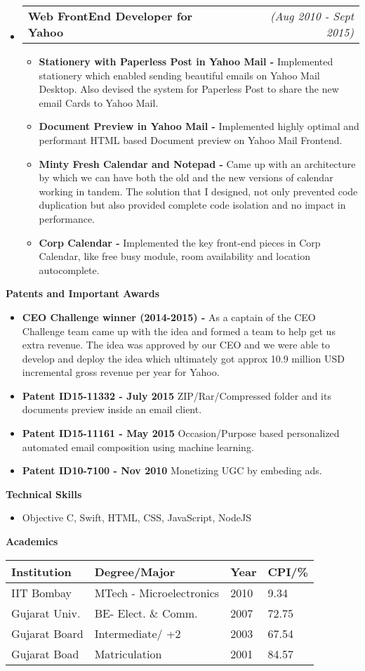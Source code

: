 \documentclass[a4paper,11pt,times]{res}
\makeatletter
\newcommand{\smalitem}[1]{\item #1 \vspace{-4pt}}
\newcommand{\resheading}[1]{{\large \colorbox{mygrey}{\begin{minipage}{\textwidth}{\textbf{#1 \vphantom{p\^{E}}}}\end{minipage}}\vspace{4pt}}}
\newcommand{\mysubheading}[2]{
\begin{tabular*}{172mm}{l@{\extracolsep{\fill}}r}
		\textbf{#1} & \textit{#2} \\
\end{tabular*}\vspace{-1pt}}
\makeatother
\begin{document}
\begin{itemize}
\item
\mysubheading{Web FrontEnd Developer for Yahoo }{(Aug 2010 - Sept 2015)}
\begin{itemize}
\vspace{-2pt}
\smalitem{\textbf{Stationery with Paperless Post in Yahoo Mail -} Implemented stationery which enabled sending beautiful emails on Yahoo Mail Desktop. Also devised the system for Paperless Post to share the new email Cards to Yahoo Mail.}
\smalitem{\textbf{Document Preview in Yahoo Mail -} Implemented highly optimal and performant HTML based Document preview on Yahoo Mail Frontend.}
\smalitem{\textbf{Minty Fresh Calendar and Notepad -} Came up with an architecture by which we can have both the old and the new versions of calendar working in tandem. The solution that I designed, not only prevented code duplication but also provided complete code isolation and no impact in performance.}
\smalitem{\textbf{Corp Calendar -} Implemented the key front-end pieces in Corp Calendar, like free busy module, room availability and location autocomplete.}
\end{itemize}

\end{itemize}

\resheading{Patents and Important Awards}
\begin{itemize}
\smalitem{\textbf{CEO Challenge winner (2014-2015)  -} As a captain of the CEO Challenge team came up with the idea and formed a team to help get us extra revenue. The idea was approved by our CEO and we were able to develop and deploy the idea which ultimately got approx 10.9 million USD incremental gross revenue per year for Yahoo.}
\smalitem{\textbf{Patent ID15-11332 - July 2015} ZIP/Rar/Compressed folder and its documents preview inside an email client.}
\smalitem{\textbf{Patent ID15-11161 - May 2015} Occasion/Purpose based personalized automated email composition using machine learning.}
\smalitem{\textbf{Patent ID10-7100 - Nov 2010} Monetizing UGC by embeding ads.}
\end{itemize}


\resheading{Technical Skills}
\begin{itemize}
\smalitem{Objective C, Swift, HTML, CSS, JavaScript, NodeJS}
\end{itemize} 

\resheading{Academics}
\begin{tabular*}{105mm}{l l l l}
\hline
\textbf{Institution}&\textbf{Degree/Major}&\textbf{Year}&\textbf{CPI/\%}\\
\hline
IIT Bombay & MTech - Microelectronics & 2010 & 9.34\\
Gujarat Univ. & BE- Elect. \& Comm. & 2007 & 72.75\\
Gujarat Board & Intermediate/ +2 & 2003 & 67.54\\
Gujarat Boad & Matriculation & 2001 & 84.57\\
\hline
\end{tabular*}
\end{document}
